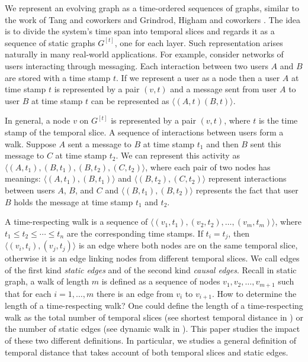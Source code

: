 \documentclass[12pt]{article}
\theoremstyle{definition}
\begin{document}
We represent an evolving graph as a time-ordered sequences of graphs, similar to the work of Tang and coworkers \cite{nicosia13, tang09, tang102, tang10} and Grindrod, Higham and coworkers \cite{grindrod13,grindrod11}. The idea is to divide the system's time span into temporal slices and regards it as a sequence of static graphs $G^{[t]}$, one for each layer. Such representation arises naturally in many real-world applications. For example,
consider networks of users interacting through messaging. Each interaction between two users $A$ and $B$ are stored with a time stamp $t$. If we represent a user as a node then a user $A$ at time stamp $t$ is represented by a pair $(v,t)$ and a message sent from user $A$ to user $B$ at time stamp $t$ can be represented as $\langle (A, t) (B, t) \rangle$.

In general, a node $v$ on $G^{[t]}$ is represented by a pair $(v, t)$, where $t$ is the time stamp of the temporal slice.
A sequence of interactions between users form a walk. Suppose $A$ sent a message to $B$ at time stamp $t_1$
and then $B$ sent this message to $C$ at time stamp $t_2$. We can represent this activity as $\langle (A,t_1), (B,t_1), (B, t_2), (C,t_2)\rangle$, where each pair of two nodes has meanings: $\langle (A,t_1), (B,t_1) \rangle$ and $\langle (B,t_2), (C,t_2) \rangle$ represent interactions between users $A$, $B$, and $C$ and $\langle (B,t_1), (B,t_2) \rangle$ represents the fact that user $B$ holds the message at time stamp $t_1$ and $t_2$.

A time-respecting walk is a sequence of $\langle (v_1, t_1), (v_2, t_2), \ldots ,(v_m, t_m)\rangle$, where $t_1 \le t_2 \le \cdots \le t_n$ are the corresponding time stamps. If $t_i = t_j$, then $\langle (v_i, t_i), (v_j, t_j) \rangle$ is an edge where both nodes are on the same temporal slice,  otherwise it is an edge linking nodes from different temporal slices.
We call edges of the first kind \emph{static edges} and of the second kind \emph{causal edges}.
Recall in static graph, a walk of length $m$ is defined as a sequence of nodes $v_1, v_2, \ldots, v_{m+1}$ such that for each $i = 1, \ldots, m$ there is an edge from $v_i$ to $v_{i+1}$. How to determine the length of a time-respecting walk?
One could define the length of a time-respecting walk as the total number of temporal slices (see shortest temporal distance in \cite{tang09}) or the number of static edges (see dynamic walk in \cite{grindrod11}). This paper studies the impact of these two different definitions. In particular, we studies a general definition of temporal distance that takes account of both temporal slices and static edges.
\end{document}
